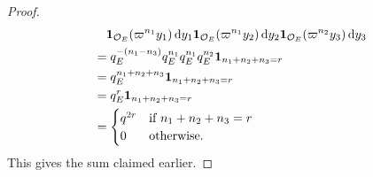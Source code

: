 \begin{proof}
\begin{align*}
    &\quad \mathbf{1}_{\OO_E}(\varpi^{n_1} y_1) \odif y_1
      \mathbf{1}_{\OO_E}(\varpi^{n_1} y_2) \odif y_2
     \mathbf{1}_{\OO_E}(\varpi^{n_2} y_3) \odif y_3 \\
    &= q_E^{-(n_1-n_3)} q_E^{n_1} q_E^{n_1} q_E^{n_2} \mathbf{1}_{n_1+n_2+n_3=r} \\
    &= q_E^{n_1+n_2+n_3}\mathbf{1}_{n_1+n_2+n_3=r} \\
    &= q_E^{r}\mathbf{1}_{n_1+n_2+n_3=r} \\
    &= \begin{cases}
      q^{2r} & \text{if }n_1 + n_2 + n_3 = r \\
      0 & \text{otherwise}.
    \end{cases}
  \end{align*}
  This gives the sum claimed earlier.
\end{proof}

